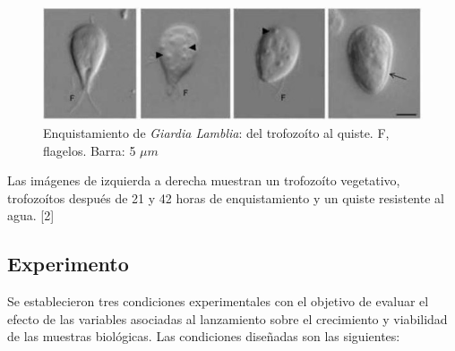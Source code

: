     \begin{figure}[H]
      \centering
      \includegraphics[width=1\textwidth]{./image/Giardia/Enquistamiento.jpg}
      \caption{Enquistamiento de \textit{Giardia Lamblia}: del trofozoíto al quiste. F, flagelos. Barra: 5 $\mu m$}
      \label{fig:enquistamiento}
    \end{figure}

    Las imágenes de izquierda a derecha muestran un trofozoíto vegetativo, trofozoítos después de 21 y
    42 horas de enquistamiento y un quiste resistente al agua. [2]

  \subsection{Experimento}
    Se establecieron tres condiciones experimentales con el objetivo de evaluar el efecto de las
    variables asociadas al lanzamiento sobre el crecimiento y viabilidad de las muestras biológicas.
    Las condiciones diseñadas son las siguientes:
 
